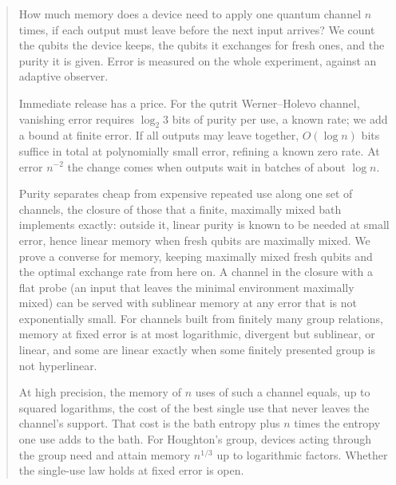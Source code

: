 \begin{abstract}
How much memory does a device need to apply one quantum channel $n$
times, if each output must leave before the next input arrives? We count
the qubits the device keeps, the qubits it exchanges for fresh ones, and
the purity it is given. Error is measured on the whole experiment,
against an adaptive observer.

Immediate release has a price. For the qutrit Werner--Holevo channel,
vanishing error requires $\log_2 3$ bits of purity per use, a known rate;
we add a bound at finite error. If all outputs may
leave together, $O(\log n)$ bits suffice in total at polynomially small
error, refining a known zero rate. At error $n^{-2}$ the change comes
when outputs wait in batches of about $\log n$.

Purity separates cheap from expensive repeated use along one set of
channels, the closure of those that a finite, maximally mixed bath
implements exactly: outside it, linear purity is known to be needed
at small error, hence linear memory when fresh qubits are maximally
mixed. We prove a converse for memory, keeping maximally mixed fresh
qubits and the optimal exchange rate from here on. A channel in the
closure with a flat probe (an input that leaves the minimal environment
maximally mixed) can be served with sublinear memory at any error that
is not exponentially small. For channels built from finitely many group
relations, memory at fixed error is at most logarithmic, divergent but
sublinear, or linear, and some are linear exactly when some finitely
presented group is not hyperlinear.

At high precision, the memory of $n$ uses of such a channel equals, up
to squared logarithms, the cost of the best single use that never leaves
the channel's support. That cost is the bath entropy plus
$n$ times the entropy one use adds to the bath. For Houghton's group,
devices acting through the group need and attain memory
$n^{1/3}$ up to logarithmic factors. Whether the single-use law holds
at fixed error is open.
\end{abstract}
